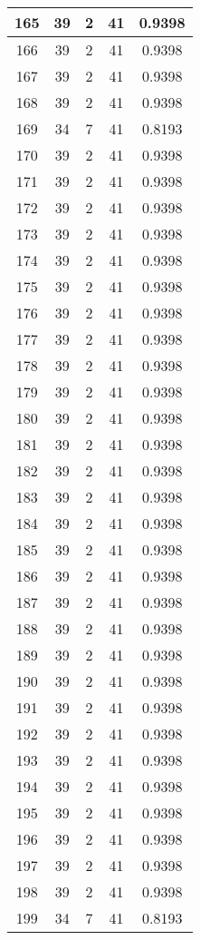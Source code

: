 \documentclass[letterpaper, 12pt]{article}
\begin{document}
\begin{longtable}{|c|c|c|c|c|}
\hline
165 & 39 & 2 & 41 & 0.9398 \\
\hline
166 & 39 & 2 & 41 & 0.9398 \\
\hline
167 & 39 & 2 & 41 & 0.9398 \\
\hline
168 & 39 & 2 & 41 & 0.9398 \\
\hline
169 & 34 & 7 & 41 & 0.8193 \\
\hline
170 & 39 & 2 & 41 & 0.9398 \\
\hline
171 & 39 & 2 & 41 & 0.9398 \\
\hline
172 & 39 & 2 & 41 & 0.9398 \\
\hline
173 & 39 & 2 & 41 & 0.9398 \\
\hline
174 & 39 & 2 & 41 & 0.9398 \\
\hline
175 & 39 & 2 & 41 & 0.9398 \\
\hline
176 & 39 & 2 & 41 & 0.9398 \\
\hline
177 & 39 & 2 & 41 & 0.9398 \\
\hline
178 & 39 & 2 & 41 & 0.9398 \\
\hline
179 & 39 & 2 & 41 & 0.9398 \\
\hline
180 & 39 & 2 & 41 & 0.9398 \\
\hline
181 & 39 & 2 & 41 & 0.9398 \\
\hline
182 & 39 & 2 & 41 & 0.9398 \\
\hline
183 & 39 & 2 & 41 & 0.9398 \\
\hline
184 & 39 & 2 & 41 & 0.9398 \\
\hline
185 & 39 & 2 & 41 & 0.9398 \\
\hline
186 & 39 & 2 & 41 & 0.9398 \\
\hline
187 & 39 & 2 & 41 & 0.9398 \\
\hline
188 & 39 & 2 & 41 & 0.9398 \\
\hline
189 & 39 & 2 & 41 & 0.9398 \\
\hline
190 & 39 & 2 & 41 & 0.9398 \\
\hline
191 & 39 & 2 & 41 & 0.9398 \\
\hline
192 & 39 & 2 & 41 & 0.9398 \\
\hline
193 & 39 & 2 & 41 & 0.9398 \\
\hline
194 & 39 & 2 & 41 & 0.9398 \\
\hline
195 & 39 & 2 & 41 & 0.9398 \\
\hline
196 & 39 & 2 & 41 & 0.9398 \\
\hline
197 & 39 & 2 & 41 & 0.9398 \\
\hline
198 & 39 & 2 & 41 & 0.9398 \\
\hline
199 & 34 & 7 & 41 & 0.8193 \\
\hline
\end{longtable}
\end{document}
